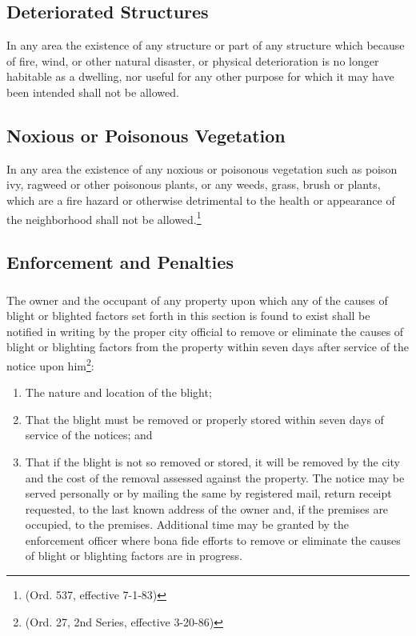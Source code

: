 \subsection{Deteriorated Structures}
In any area the existence of any structure or part of any structure which because of fire, wind, or other natural disaster, or physical deterioration is no longer habitable as a dwelling, nor useful for any other purpose for which it may have been intended shall not be allowed.
\subsection{Noxious or Poisonous Vegetation}
In any area the existence of any noxious or poisonous vegetation such as poison ivy, ragweed or other poisonous plants, or any weeds, grass, brush or plants, which are a fire hazard or otherwise detrimental to the health or appearance of the neighborhood shall not be allowed.\footnote{(Ord. 537, effective 7-1-83)}
\subsection{Enforcement and Penalties}
\subsubsection{}
The owner and the occupant of any property upon which any of the causes of blight or blighted factors set forth in this section is found to exist shall be notified in writing by the proper city official to remove or eliminate the causes of blight or blighting factors from the property within seven days after service of the notice upon him\footnote{(Ord. 27, 2nd Series, effective 3-20-86)}:
\begin{enumerate}[{\indent}a)]
    \item The nature and location of the blight; 
    \item That the blight must be removed or properly stored within seven days of service of the notices; and 
    \item That if the blight is not so removed or stored, it will be removed by the city and the cost of the removal assessed against the property. The notice may be served personally or by mailing the same by registered mail, return receipt requested, to the last known address of the owner and, if the premises are occupied, to the premises. Additional time may be granted by the enforcement officer where bona fide efforts to remove or eliminate the causes of blight or blighting factors are in progress.
\end{enumerate}
